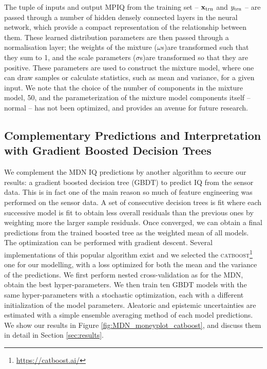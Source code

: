  The tuple of inputs and output MPIQ from the training set -- $\mathbf{x_{\rm trn}}$ and $y_{\rm trn}$ -- are passed through a number of hidden densely connected layers in the neural network, which provide a compact representation of the relationship between them. These learned distribution parameters are then passed through a normalisation layer; the weights of the mixture ($\omega$s)are transformed such that they sum to 1, and the scale parameters ($\sigma$s)are transformed so that they are positive.  These parameters are used to construct the mixture model, where one can draw samples or calculate statistics, such as mean and variance, for a given input. We note that the choice of the number of components in the mixture model, 50, and the parameterization of the mixture model components itself -- normal -- has not been optimized, and provides an avenue for future research.

\fi

\subsection{Complementary Predictions and Interpretation with Gradient Boosted Decision Trees}
\label{sec:gbdt}

We complement the MDN IQ predictions by another algorithm to secure our results: a gradient boosted decision tree (GBDT) to predict IQ from the sensor data. This is in fact one of the main reason so much of feature engineering was performed on the sensor data.
A set of consecutive decision trees is fit where each successive model is fit to obtain less overall residuals than the previous ones by weighting more the larger sample residuals. Once converged, we can obtain a final predictions from the trained boosted tree as the weighted mean of all models. The optimization can be performed with gradient descent. Several implementations of this popular algorithm exist and we selected the \textsc{catboost}\footnote{\url{https://catboost.ai/}} one for our modelling, with a loss optimized for both the mean and the variance of the predictions. We first perform nested cross-validation as for the MDN, obtain the best hyper-parameters. We then train ten  GBDT models with the same hyper-parameters with a stochastic optimization, each with a different initialization of the model parameters. Aleatoric and epistemic uncertainties are estimated with a simple ensemble averaging method \citep{malinin2021uncertainty} of each model predictions. We show our results in Figure \ref{fig:MDN_moneyplot_catboost}, and discuss them in detail in Section \ref{sec:results}.


